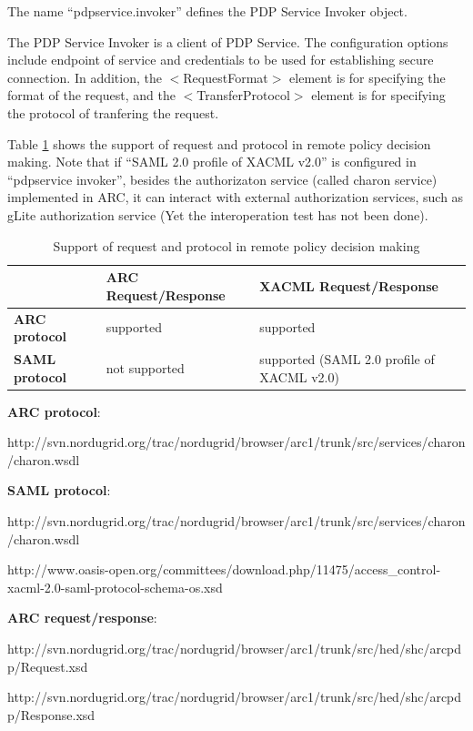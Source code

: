 \documentclass{article}                            %
\begin{document}
The name ``pdpservice.invoker'' defines the PDP Service Invoker object.

The PDP Service Invoker is a client of PDP Service. The configuration options include endpoint of service and credentials to be used for establishing secure connection. In addition, the $<$RequestFormat$>$ element is for specifying the format of the request, and the $<$TransferProtocol$>$ element is for specifying the protocol of tranfering the request.

Table \ref{table:support_pdp_request_protocol} shows the support of request and protocol in remote policy decision making. Note that if ``SAML 2.0 profile of XACML v2.0'' is configured in ``pdpservice invoker'', besides the authorizaton service (called charon service) implemented in ARC, it can interact with external authorization services, such as gLite authorization service (Yet the interoperation test has not been done).

\begin{table}[ht]
\caption{Support of request and protocol in remote policy decision making}
\centering
\begin{tabular}{| l | p{7cm} | p{5cm} |}
\hline
\textbf{  } & \textbf{ARC Request/Response} & \textbf{XACML Request/Response} \\ \hline
\textbf{ARC protocol} & supported & supported \\ \hline
\textbf{SAML protocol} & not supported & supported (SAML 2.0 profile of XACML v2.0) \\ \hline
\end{tabular}
\label{table:support_pdp_request_protocol}
\end{table}

\textbf{ARC protocol}:

http://svn.nordugrid.org/trac/nordugrid/browser/arc1/trunk/src/services/charon/charon.wsdl

\textbf{SAML protocol}:

http://svn.nordugrid.org/trac/nordugrid/browser/arc1/trunk/src/services/charon/charon.wsdl

http://www.oasis-open.org/committees/download.php/11475/access\_control-xacml-2.0-saml-protocol-schema-os.xsd

\textbf{ARC request/response}:

http://svn.nordugrid.org/trac/nordugrid/browser/arc1/trunk/src/hed/shc/arcpdp/Request.xsd

http://svn.nordugrid.org/trac/nordugrid/browser/arc1/trunk/src/hed/shc/arcpdp/Response.xsd
\end{document}
